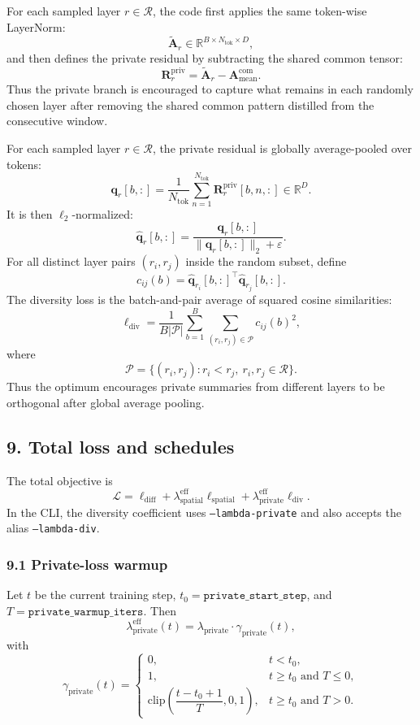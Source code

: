 \documentclass[11pt]{article}
\begin{document}
For each sampled layer $r\in\mathcal{R}$, the code first applies the same token-wise LayerNorm:
\[
  \tilde{\bm{A}}_r \in \mathbb{R}^{B\times N_{\mathrm{tok}}\times D},
\]
and then defines the private residual by subtracting the shared common tensor:
\[
  \bm{R}^{\mathrm{priv}}_r
  =
  \tilde{\bm{A}}_r - \bm{A}^{\mathrm{com}}_{\mathrm{mean}}.
\]
Thus the private branch is encouraged to capture what remains in each randomly chosen layer after removing the shared common pattern distilled from the consecutive window.

For each sampled layer $r\in\mathcal{R}$, the private residual is globally average-pooled over tokens:
\[
  \bm{q}_r[b,:]
  =
  \frac{1}{N_{\mathrm{tok}}}
  \sum_{n=1}^{N_{\mathrm{tok}}}
  \bm{R}^{\mathrm{priv}}_r[b,n,:]
  \in \mathbb{R}^{D}.
\]
It is then $\ell_2$-normalized:
\[
  \hat{\bm{q}}_r[b,:]
  =
  \frac{\bm{q}_r[b,:]}{\|\bm{q}_r[b,:]\|_2 + \varepsilon}.
\]
For all distinct layer pairs $(r_i,r_j)$ inside the random subset, define
\[
  c_{ij}(b)
  =
  \hat{\bm{q}}_{r_i}[b,:]^\top \hat{\bm{q}}_{r_j}[b,:].
\]
The diversity loss is the batch-and-pair average of squared cosine similarities:
\[
  \ell_{\mathrm{div}}
  =
  \frac{1}{B |\mathcal{P}|}
  \sum_{b=1}^{B}
  \sum_{(r_i,r_j)\in\mathcal{P}}
  c_{ij}(b)^2,
\]
where
\[
  \mathcal{P} = \{(r_i,r_j): r_i < r_j,\ r_i,r_j \in \mathcal{R}\}.
\]
Thus the optimum encourages private summaries from different layers to be orthogonal after global average pooling.

\subsection*{9. Total loss and schedules}
The total objective is
\[
  \mathcal{L}
  =
  \ell_{\mathrm{diff}}
  +
  \lambda_{\mathrm{spatial}}^{\mathrm{eff}} \ell_{\mathrm{spatial}}
  +
  \lambda_{\mathrm{private}}^{\mathrm{eff}} \ell_{\mathrm{div}}.
\]
In the CLI, the diversity coefficient uses \texttt{--lambda-private} and also accepts the alias \texttt{--lambda-div}.

\subsubsection*{9.1 Private-loss warmup}
Let $t$ be the current training step, $t_0=\texttt{private\_start\_step}$, and $T=\texttt{private\_warmup\_iters}$. Then
\[
  \lambda_{\mathrm{private}}^{\mathrm{eff}}(t)
  =
  \lambda_{\mathrm{private}} \cdot \gamma_{\mathrm{private}}(t),
\]
with
\[
  \gamma_{\mathrm{private}}(t)
  =
  \begin{cases}
    0, & t < t_0,\\[4pt]
    1, & t\ge t_0 \text{ and } T\le 0,\\[4pt]
    \mathrm{clip}\!\left(\dfrac{t-t_0+1}{T}, 0, 1\right),
    & t\ge t_0 \text{ and } T>0.
  \end{cases}
\]
\end{document}
